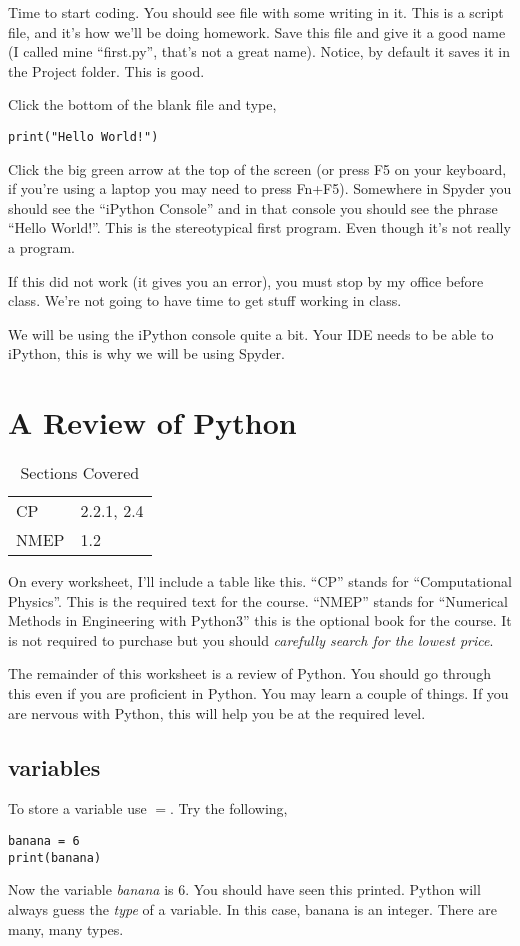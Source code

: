 \documentclass[11pt,letterpaper]{article}
\begin{document}
Time to start coding. You should see file with some writing in it. This is a script file, and it's how we'll be doing homework. Save this file and give it a good name (I called mine ``first.py'', that's not a great name). Notice, by default it saves it in the Project folder. This is good.

Click the bottom of the blank file and type,
\begin{verbatim}
print("Hello World!")
\end{verbatim}
Click the big green arrow at the top of the screen (or press F5 on your keyboard, if you're using a laptop you may need to press Fn+F5). Somewhere in Spyder you should see the ``iPython Console'' and in that console you should see the phrase ``Hello World!''. This is the stereotypical first program. Even though it's not really a program. 

If this did not work (it gives you an error), you must stop by my office before class. We're not going to have time to get stuff working in class.


We will be using the iPython console quite a bit. Your IDE needs to be able to iPython, this is why we will be using Spyder. 

\section{A Review of Python}


\begin{table}[!ht]
 \centering
 \begin{tabular}{ll}
   CP & 2.2.1, 2.4 \\
 NMEP &  1.2 
 \end{tabular}
\caption{Sections Covered}
\end{table}


On every worksheet, I'll include a table like this. ``CP'' stands for ``Computational Physics''. This is the required text for the course. ``NMEP'' stands for ``Numerical Methods in Engineering with Python3'' this is the optional book for the course. It is not required to purchase but you should \emph{carefully search for the lowest price}.

The remainder of this worksheet is a review of Python. You should go through this even if you are proficient in Python. You may learn a couple of things. If you are nervous with Python, this will help you be at the required level.



\subsection{variables}
To store a variable use $=$. Try the following,
\begin{verbatim}
banana = 6
print(banana)
\end{verbatim}
Now the variable \emph{banana} is 6. You should have seen this printed. Python will always guess the
\emph{type} of a variable. In this case, banana is an integer. There are many, many types.
\end{document}
